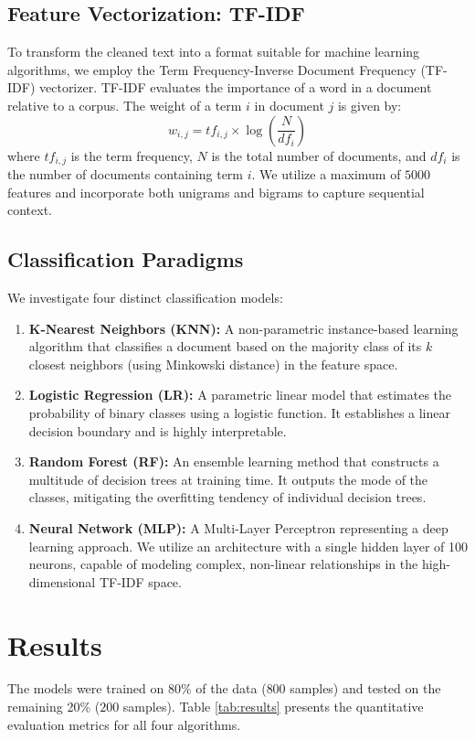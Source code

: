 \documentclass[conference]{IEEEtran}
\begin{document}
\subsection{Feature Vectorization: TF-IDF}
To transform the cleaned text into a format suitable for machine learning algorithms, we employ the Term Frequency-Inverse Document Frequency (TF-IDF) vectorizer. TF-IDF evaluates the importance of a word in a document relative to a corpus. The weight of a term $i$ in document $j$ is given by:
\begin{equation}
w_{i,j} = tf_{i,j} \times \log\left(\frac{N}{df_i}\right)
\end{equation}
where $tf_{i,j}$ is the term frequency, $N$ is the total number of documents, and $df_i$ is the number of documents containing term $i$. We utilize a maximum of $5000$ features and incorporate both unigrams and bigrams to capture sequential context.

\subsection{Classification Paradigms}
We investigate four distinct classification models:
\begin{enumerate}
    \item \textbf{K-Nearest Neighbors (KNN):} A non-parametric instance-based learning algorithm that classifies a document based on the majority class of its $k$ closest neighbors (using Minkowski distance) in the feature space.
    \item \textbf{Logistic Regression (LR):} A parametric linear model that estimates the probability of binary classes using a logistic function. It establishes a linear decision boundary and is highly interpretable.
    \item \textbf{Random Forest (RF):} An ensemble learning method that constructs a multitude of decision trees at training time. It outputs the mode of the classes, mitigating the overfitting tendency of individual decision trees.
    \item \textbf{Neural Network (MLP):} A Multi-Layer Perceptron representing a deep learning approach. We utilize an architecture with a single hidden layer of 100 neurons, capable of modeling complex, non-linear relationships in the high-dimensional TF-IDF space.
\end{enumerate}

\section{Results}
The models were trained on 80\% of the data ($800$ samples) and tested on the remaining 20\% ($200$ samples). Table \ref{tab:results} presents the quantitative evaluation metrics for all four algorithms.
\end{document}
